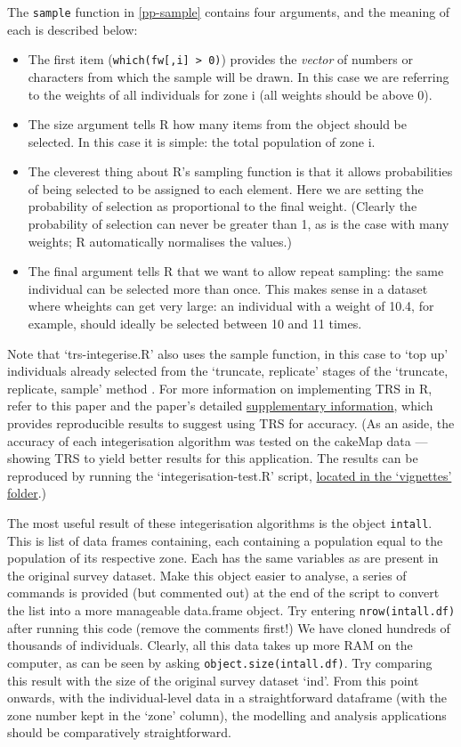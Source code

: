 \documentclass[a4paper, 11pt, twoside]{article}
\begin{document}
The \texttt{sample} function in \cref{pp-sample} contains four arguments, and
the meaning of each is described below:
\begin{itemize}
 \item The first item (\texttt{which(fw[,i] > 0)}) provides the \emph{vector} of
numbers or characters from which the sample will be drawn. In this case we are referring
to the weights of all individuals for zone i (all weights should be above 0).
\item The size argument tells R how many items from the object should be selected.
In this case it is simple: the total population of zone i.
\item The cleverest thing about R's sampling function is that it allows probabilities
of being selected to be assigned to each element. Here we are setting the probability
of selection as proportional to the final weight. (Clearly the probability of
selection can never be greater than 1, as is the case with many weights; R
automatically normalises the values.)
\item The final argument tells R that we want to allow repeat sampling:
the same individual can be selected more than once. This makes sense in a
dataset where wheights can get very large: an individual with a weight of 10.4,
for example, should ideally be selected between 10 and 11 times.
\end{itemize}

Note that `trs-integerise.R' also uses the sample function, in this case to
`top up' individuals already selected from the `truncate, replicate' stages
of the `truncate, replicate, sample' method \citep{Lovelace2013-trs}.
For more information on implementing TRS in R, refer to this paper and the paper's detailed
\href{http://eprints.whiterose.ac.uk/77037/7/lovelacesupplement-3.pdf}{supplementary information},
which provides reproducible results to suggest using TRS for accuracy.
(As an aside, the accuracy of each integerisation algorithm was
tested on the cakeMap data --- showing TRS to yield better results for this application.
The results can be reproduced by running the `integerisation-test.R'
script, \href{https://github.com/Robinlovelace/smsim-course/tree/master/vignettes}{located in the `vignettes' folder}.)

The most useful result of these integerisation algorithms is the object \texttt{intall}.
This is list of data frames containing, each containing a population equal
to the population of its respective zone. Each has the same
variables as are present in the original survey dataset. Make
this object easier to analyse, a series of commands is provided
(but commented out) at the end of the script to convert the list into
a more manageable data.frame object. Try entering
\texttt{nrow(intall.df)} after running this code (remove the comments first!)
We have cloned hundreds of thousands of individuals.
Clearly, all this data takes up more RAM on the computer, as can be seen by
asking \texttt{object.size(intall.df)}. Try comparing this result with the
size of the original survey dataset `ind'. From this point onwards,
with the individual-level data in a straightforward dataframe
(with the zone number kept in the `zone' column), the modelling and
analysis applications should be comparatively straightforward.
\end{document}
